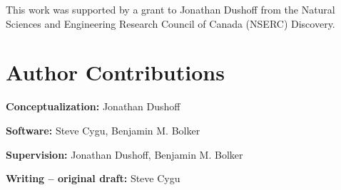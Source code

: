 This work was supported by a grant to Jonathan Dushoff from the Natural Sciences and Engineering Research Council of Canada (NSERC) Discovery.

\section*{Author Contributions}

\textbf{Conceptualization:} Jonathan Dushoff

\noindent\textbf{Software:} Steve Cygu, Benjamin M. Bolker

\noindent\textbf{Supervision:} Jonathan Dushoff, Benjamin M. Bolker

\noindent\textbf{Writing – original draft:} Steve Cygu


\nolinenumbers
